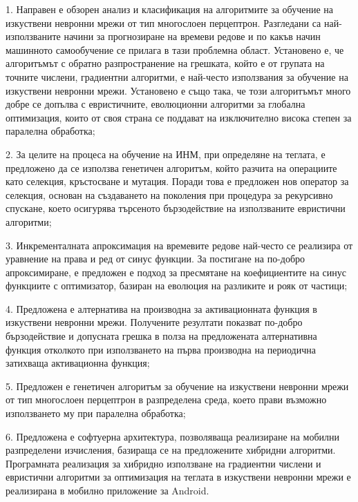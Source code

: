 \begin{description}
\item 1. Направен е обзорен анализ и класификация на алгоритмите за обучение на изкуствени невронни мрежи от тип многослоен перцептрон. Разгледани са най-използваните начини за прогнозиране на времеви редове и по какъв начин машинното самообучение се прилага в тази проблемна област. Установено е, че алгоритъмът с обратно разпространение на грешката, който е от групата на точните числени, градиентни алгоритми, е най-често използвания за обучение на изкуствени невронни мрежи. Установено е също така, че този алгоритъмът много добре се допълва с евристичните, еволюционни алгоритми за глобална оптимизация, които от своя страна се поддават на изключително висока степен за паралелна обработка;
\item 2. За целите на процеса на обучение на ИНМ, при определяне на теглата, е предложено да се използва генетичен алгоритъм, който разчита на операциите като селекция, кръстосване и мутация. Поради това е предложен нов оператор за селекция, основан на създаването на поколения при процедура за рекурсивно спускане, което осигурява търсеното бързодействие на използваните евристични алгоритми;
\item 3. Инкременталната апроксимация на времевите редове най-често се реализира от уравнение на права и ред от синус функции. За постигане на по-добро апроксимиране, е предложен е подход за пресмятане на коефициентите на синус функциите с оптимизатор, базиран на еволюция на разликите и рояк от частици;
\item 4.	Предложена е алтернатива на производна за активационната функция в изкуствени невронни мрежи. Получените резултати показват по-добро бързодействие и допусната грешка в полза на предложената алтернативна функция отколкото при използването на първа производна на периодична затихваща активационна функция;
\item 5.	Предложен е генетичен алгоритъм за обучение на изкуствени невронни мрежи от тип многослоен перцептрон в разпределена среда, което прави възможно използването му при паралелна обработка;
\item 6.	Предложена е софтуерна архитектура, позволяваща реализиране на мобилни разпределени изчисления, базираща се на предложените хибридни алгоритми. Програмната реализация за хибридно използване на градиентни числени и евристични алгоритми за оптимизация на теглата в изкуствени невронни мрежи е реализирана в мобилно приложение за Android.
\end{description}

